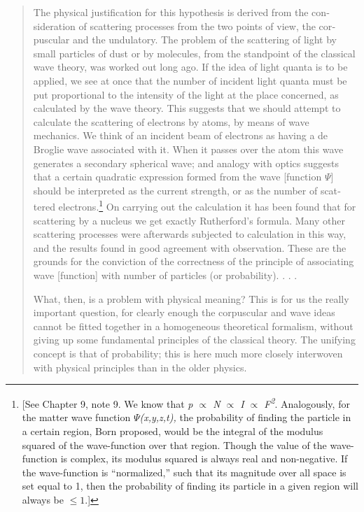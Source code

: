 \begin{quotation}
The physical justification for this hypothesis is derived from the
con­sideration of scattering processes from the two points of view, the
cor­puscular and the undulatory. The problem of the scattering of light
by small particles of dust or by molecules, from the standpoint of the
classical wave theory, was worked out long ago. If the idea of light
quanta is to be applied, we see at once that the number of incident
light quanta must be put proportional to the intensity of the light at
the place concerned, as calculated by the wave theory. This suggests
that we should attempt to calculate the scattering of electrons by
atoms, by means of wave mechanics. We think of an incident beam of
electrons as having a de Broglie wave associated with it. When it passes
over the atom this wave generates a secondary spherical wave; and
analogy with optics sug­gests that a certain quadratic expression formed
from the wave {[}function $\Psi${]} should be interpreted as the
current strength, or as the number of scat­tered electrons.\footnote{{[}See
  Chapter 9, note 9. We know that \emph{p $\propto$ N $\propto$ I $\propto$ F\textsuperscript{2}}.
  Analogously, for the matter wave function \emph{$\Psi$(x,y,z,t),} the
  probability of finding the particle in a certain region, Born proposed,
  would be the integral of the modulus squared of
  the wave-function over that region. Though the value of the wave-function
  is complex, its modulus squared is always real and non-negative. If
  the wave-function is ``normalized,'' such that its magnitude over all
  space is set equal to 1, then the probability of finding its particle
  in a given region will always be $\leq 1$.{]}} On carrying out the calculation it
has been found that for scattering by a nucleus we get exactly
Rutherford's formula. Many other scattering processes were afterwards
subjected to calculation in this way, and the results found in good
agreement with observation. These are the grounds for the conviction of
the correctness of the principle of associating wave {[}function{]} with
number of particles (or probability). . . .

What, then, is a problem with physical meaning? This is for us the
really important question, for clearly enough the corpuscular and wave
ideas cannot be fitted together in a homogeneous theoretical formalism,
without giving up some funda­mental principles of the classical theory.
The unifying concept is that of probability; this is here much more
closely interwoven with physical principles than in the older physics.
\end{quotation}

